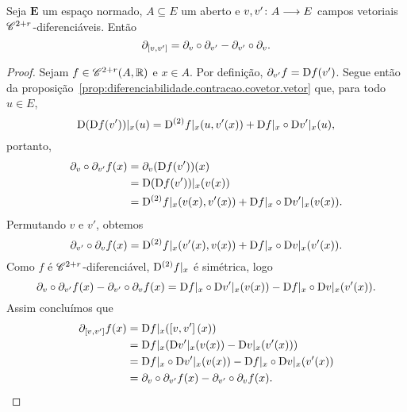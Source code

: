 \begin{proposition}
Seja $\bm E$ um espaço normado, $A \subseteq E$ um aberto e $v,v'\colon \allowbreak A \longrightarrow E$ campos vetoriais $\mathscr{C}^{2+r}$-diferenciáveis. Então
	\begin{equation*}
	\partial_{\left[{v},{v'}\right]} = \partial_{v} \circ \partial_{v'} - \partial_{v'} \circ \partial_{v}.
	\end{equation*}
\end{proposition}
\begin{proof}
Sejam $f \in \mathscr{C}^{2+r}(A,\mathbb{R})$ e $x \in A$. Por definição, $\partial_{v'} f = \mathrm{D} f(v')$. Segue então da proposição~\ref{prop:diferenciabilidade.contracao.covetor.vetor} que, para todo $u \in E$,
	\begin{equation*}
	\mathrm{D} (\mathrm{D} f(v'))|_x(u) = \mathrm{D}^{(2)} f|_x(u, v'(x)) + \mathrm{D} f|_x \circ \mathrm{D} v'|_x(u),
	\end{equation*}
portanto,
	\begin{align*}
	\partial_{v} \circ \partial_{v'} f(x) &= \partial_{v}(\mathrm{D} f(v'))(x) \\
		&= \mathrm{D} (\mathrm{D} f(v'))|_x (v(x)) \\
		&= \mathrm{D}^{(2)} f|_x(v(x), v'(x)) + \mathrm{D} f|_x \circ \mathrm{D} v'|_x(v(x)).
	\end{align*}
Permutando $v$ e $v'$, obtemos
	\begin{equation*}
	\partial_{v'} \circ \partial_{v} f(x) = \mathrm{D}^{(2)} f|_x(v'(x), v(x)) + \mathrm{D} f|_x \circ \mathrm{D} v|_x(v'(x)).
	\end{equation*}
Como  $f$ é $\mathscr{C}^{2+r}$-diferenciável, $\mathrm{D}^{(2)} f|_x$ é simétrica, logo
	\begin{equation*}
	\partial_{v} \circ \partial_{v'} f(x) - \partial_{v'} \circ \partial_{v} f(x) = \mathrm{D} f|_x \circ \mathrm{D} v'|_x(v(x)) - \mathrm{D} f|_x \circ \mathrm{D} v|_x(v'(x)).
	\end{equation*}
Assim concluímos que
	\begin{align*}
	\partial_{\left[{v},{v'}\right]}f(x) &= \mathrm{D} f|_x(\left[{v},{v'}\right](x)) \\
		&= \mathrm{D} f|_x (\mathrm{D} v'|_x(v(x)) - \mathrm{D} v|_x(v'(x))) \\
		&= \mathrm{D} f|_x \circ \mathrm{D} v'|_x(v(x)) - \mathrm{D} f|_x \circ \mathrm{D} v|_x(v'(x)) \\
		&= \partial_{v} \circ \partial_{v'} f(x) - \partial_{v'} \circ \partial_{v} f(x).
		\qedhere
	\end{align*}
\end{proof}













